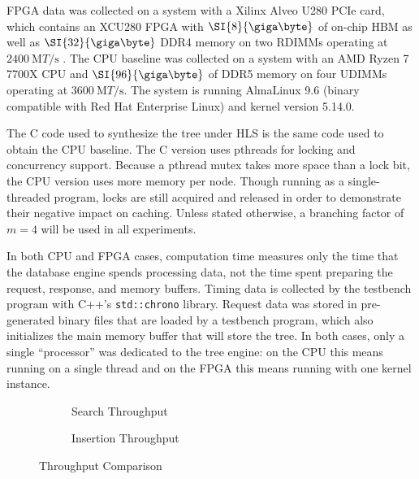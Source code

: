 

FPGA data was collected on a system with a Xilinx Alveo U280 PCIe card,
which contains an XCU280 FPGA with $\SI{8}{\giga\byte}$ of on-chip HBM as well
as $\SI{32}{\giga\byte}$ DDR4 memory on two RDIMMs operating at
$\SI{2400}{\mega{T}\per\second}$ \autocite{u280}. The CPU baseline was collected
on a system with an AMD Ryzen 7 7700X CPU and $\SI{96}{\giga\byte}$ of DDR5
memory on four UDIMMs operating at $\SI{3600}{\mega{T}\per\second}$. The system
is running AlmaLinux 9.6 (binary compatible with Red Hat Enterprise Linux) and
kernel version 5.14.0.

The C code used to synthesize the tree under HLS is the same code used to obtain
the CPU baseline. The C version uses pthreads for locking and concurrency
support. Because a pthread mutex takes more space than a lock bit, the CPU
version uses more memory per node. Though running as a single-threaded program,
locks are still acquired and released in order to demonstrate their negative
impact on caching.
%
Unless stated otherwise, a branching factor of $m=4$ will be used in all
experiments.



In both CPU and FPGA cases, computation time measures only the time that the
database engine spends processing data, not the time spent preparing the
request, response, and memory buffers. Timing data is collected by the testbench
program with C++'s \texttt{std::chrono} library.
%
Request data was stored in pre-generated binary files that are loaded by a
testbench program, which also initializes the main memory buffer that will store
the tree.
%
In both cases, only a single ``processor'' was dedicated to the tree engine: on
the CPU this means running on a single thread and on the FPGA this means running
with one kernel instance.



\begin{figure}[H]
	\centering
	\begin{subfigure}{7.5cm}
		\centering
		
		\caption{Search Throughput}
		\label{fig:search-throughput-comparison}
	\end{subfigure}
	\begin{subfigure}{7.5cm}
		\centering
		
		\caption{Insertion Throughput}
		\label{fig:insert-throughput-comparison}
	\end{subfigure}
	\caption{Throughput Comparison}
	\label{fig:throughput-comparison}
\end{figure}

